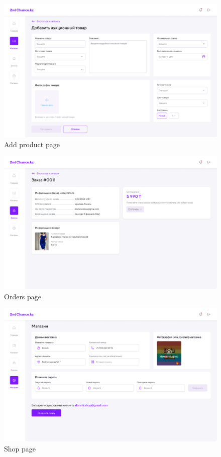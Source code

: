 \begin{figure}[h!]
    \centering
    \includegraphics[scale=0.3]{figures/Add product.png}
    \caption{Add product page}
    \label{fig:add product}
\end{figure}
\begin{figure}[h!]
    \centering
    \includegraphics[scale=0.3]{figures/Orders.png}
    \caption{Orders page}
    \label{fig:orders page}
\end{figure}
\begin{figure}[h!]
    \centering
    \includegraphics[scale=0.3]{figures/Shop.png}
    \caption{Shop page}
    \label{fig:shop page}
\end{figure}


